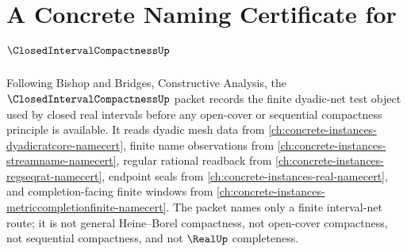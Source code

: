 \chapter{A Concrete Naming Certificate for $\ClosedIntervalCompactnessUp$}
\label{ch:concrete-instances-closed-interval-compactness-namecert}

Following Bishop and Bridges, Constructive Analysis, the $\ClosedIntervalCompactnessUp$ packet records the finite dyadic-net test object used by closed real intervals before any open-cover or sequential compactness principle is available. It reads dyadic mesh data from \autoref{ch:concrete-instances-dyadicratcore-namecert}, finite name observations from \autoref{ch:concrete-instances-streamname-namecert}, regular rational readback from \autoref{ch:concrete-instances-regseqrat-namecert}, endpoint seals from \autoref{ch:concrete-instances-real-namecert}, and completion-facing finite windows from \autoref{ch:concrete-instances-metriccompletionfinite-namecert}. The packet names only a finite interval-net route; it is not general Heine--Borel compactness, not open-cover compactness, not sequential compactness, and not $\RealUp$ completeness.

